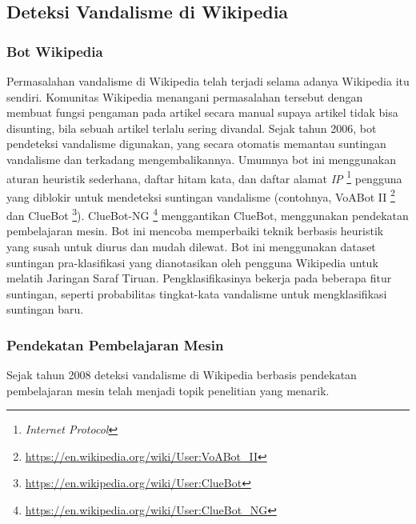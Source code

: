\documentclass[12pt,a4paper,titlepage]{article}
\begin{document}
\label{subsec:deteksi-vandalisme-di-wikipedia}
\subsection{Deteksi Vandalisme di Wikipedia}

\label{subsubsec:bot-wikipedia}
\subsubsection{Bot Wikipedia}

Permasalahan vandalisme di Wikipedia telah terjadi selama adanya Wikipedia itu sendiri.
Komunitas Wikipedia menangani permasalahan tersebut dengan membuat fungsi pengaman pada artikel secara manual supaya artikel tidak bisa disunting, bila sebuah artikel terlalu sering divandal.
Sejak tahun 2006, bot pendeteksi vandalisme digunakan, yang secara otomatis memantau suntingan vandalisme dan terkadang mengembalikannya.
Umumnya bot ini menggunakan aturan heuristik sederhana, daftar hitam kata, dan daftar alamat \textit{IP} \footnote{\textit{Internet Protocol}} pengguna yang diblokir untuk mendeteksi suntingan vandalisme (contohnya, VoABot II \footnote{\url{https://en.wikipedia.org/wiki/User:VoABot_II}} dan ClueBot \footnote{\url{https://en.wikipedia.org/wiki/User:ClueBot}}).
ClueBot-NG \footnote{\url{https://en.wikipedia.org/wiki/User:ClueBot_NG}} menggantikan ClueBot, menggunakan pendekatan pembelajaran mesin. Bot ini mencoba memperbaiki teknik berbasis heuristik yang susah untuk diurus dan mudah dilewat. Bot ini menggunakan dataset suntingan pra-klasifikasi yang dianotasikan oleh pengguna Wikipedia untuk melatih Jaringan Saraf Tiruan. Pengklasifikasinya bekerja pada beberapa fitur suntingan, seperti probabilitas tingkat-kata vandalisme untuk mengklasifikasi suntingan baru.

\label{subsubsec:pendekatan-pembelajaran-mesin}
\subsubsection{Pendekatan Pembelajaran Mesin}

Sejak tahun 2008 deteksi vandalisme di Wikipedia berbasis pendekatan pembelajaran mesin telah menjadi topik penelitian yang menarik.
\end{document}

